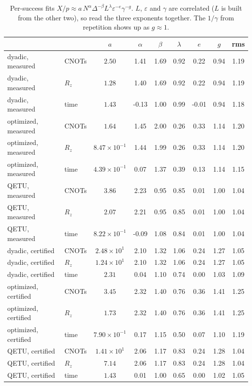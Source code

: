 \documentclass[10pt]{article}
\begin{document}
\begin{table}[h]\centering\small
\caption{Per-success fits $X/p\approx a\,N^{\alpha}\Delta^{-\beta}L^{\lambda}\varepsilon^{-e}\gamma^{-g}$. $L$, $\varepsilon$
and $\gamma$ are correlated ($L$ is built from the other two), so read the three exponents together. The $1/\gamma$
from repetition shows up as $g\approx1$.}\label{tab:succ}
\begin{tabular}{llccccccc}\toprule
 & & $a$ & $\alpha$ & $\beta$ & $\lambda$ & $e$ & $g$ & rms \\\midrule
dyadic, measured & CNOTs & $2.50$ & 1.41 & 1.69 & 0.92 & 0.22 & 0.94 & 1.19 \\
dyadic, measured & $R_z$ & $1.28$ & 1.40 & 1.69 & 0.92 & 0.22 & 0.94 & 1.19 \\
dyadic, measured & time & $1.43$ & -0.13 & 1.00 & 0.99 & -0.01 & 0.94 & 1.18 \\
\addlinespace
optimized, measured & CNOTs & $1.64$ & 1.45 & 2.00 & 0.26 & 0.33 & 1.14 & 1.20 \\
optimized, measured & $R_z$ & $8.47\times10^{-1}$ & 1.44 & 1.99 & 0.26 & 0.33 & 1.14 & 1.20 \\
optimized, measured & time & $4.39\times10^{-1}$ & 0.07 & 1.37 & 0.39 & 0.13 & 1.14 & 1.15 \\
\addlinespace
QETU, measured & CNOTs & $3.86$ & 2.23 & 0.95 & 0.85 & 0.01 & 1.00 & 1.04 \\
QETU, measured & $R_z$ & $2.07$ & 2.21 & 0.95 & 0.85 & 0.01 & 1.00 & 1.04 \\
QETU, measured & time & $8.22\times10^{-1}$ & -0.09 & 1.08 & 0.84 & 0.01 & 1.00 & 1.04 \\
\addlinespace
dyadic, certified & CNOTs & $2.48\times10^{1}$ & 2.10 & 1.32 & 1.06 & 0.24 & 1.27 & 1.05 \\
dyadic, certified & $R_z$ & $1.24\times10^{1}$ & 2.10 & 1.32 & 1.06 & 0.24 & 1.27 & 1.05 \\
dyadic, certified & time & $2.31$ & 0.04 & 1.10 & 0.74 & 0.00 & 1.03 & 1.09 \\
\addlinespace
optimized, certified & CNOTs & $3.45$ & 2.32 & 1.40 & 0.76 & 0.36 & 1.41 & 1.25 \\
optimized, certified & $R_z$ & $1.73$ & 2.32 & 1.40 & 0.76 & 0.36 & 1.41 & 1.25 \\
optimized, certified & time & $7.90\times10^{-1}$ & 0.17 & 1.15 & 0.50 & 0.07 & 1.10 & 1.19 \\
\addlinespace
QETU, certified & CNOTs & $1.41\times10^{1}$ & 2.06 & 1.17 & 0.83 & 0.24 & 1.28 & 1.04 \\
QETU, certified & $R_z$ & $7.14$ & 2.06 & 1.17 & 0.83 & 0.24 & 1.28 & 1.04 \\
QETU, certified & time & $1.43$ & 0.01 & 1.00 & 0.65 & 0.00 & 1.02 & 1.05 \\
\bottomrule\end{tabular}
\end{table}
\end{document}
